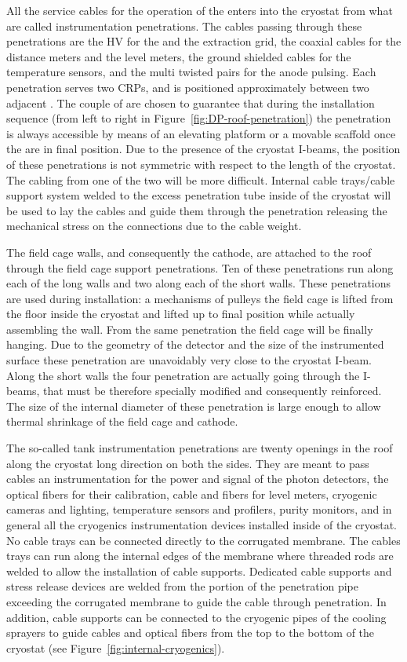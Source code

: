 All the service cables for the operation of the  enters into the cryostat from what are called  instrumentation penetrations.
The cables passing through these penetrations are the HV for the  and the extraction grid, the coaxial cables for the distance meters and the level meters, the ground shielded cables for the temperature sensors, and the multi twisted pairs for the anode pulsing.
Each penetration serves two CRPs, and is positioned approximately between two adjacent .
The couple of  are chosen to guarantee that during the installation sequence (from left to right in Figure~\ref{fig:DP-roof-penetration}) the penetration is always accessible by means of an elevating platform or a movable scaffold once the  are in final position.
Due to the presence of the cryostat I-beams, the position of these penetrations is not symmetric with respect to the length of the cryostat.
The cabling from one of the two  will be more difficult.
Internal cable trays/cable support system welded to the excess penetration tube inside of the cryostat will be used to lay the cables and guide them through the penetration releasing the mechanical stress on the connections due to the cable weight.

The field cage walls, and consequently the cathode, are attached to the roof through the field cage support penetrations.
Ten of these penetrations run along each of the long walls and two along each of the short walls.
These penetrations are used during installation: a mechanisms of pulleys the field cage is lifted from the floor inside the cryostat and lifted up to final position while actually assembling the wall.
From the same penetration the field cage will be finally hanging.
Due to the geometry of the detector and the size of the instrumented surface these penetration are unavoidably very close to the cryostat I-beam.
Along the short walls the four penetration are actually going through the I-beams, that must be therefore specially modified and consequently reinforced.
The size of the internal diameter of these penetration is large enough to allow thermal shrinkage of the field cage and cathode.

The so-called tank instrumentation penetrations are twenty openings in the roof along the cryostat long direction on both the sides.
They are meant to pass cables an instrumentation for the power and signal of the photon detectors, the optical fibers for their calibration, cable and fibers for level meters, cryogenic cameras and lighting, temperature sensors and profilers, purity monitors, and in general all the cryogenics instrumentation devices installed inside of the cryostat.
No cable trays can be connected directly to the corrugated membrane.
The cables trays can run along the internal edges of the membrane where threaded rods are welded to allow the installation of cable supports.
Dedicated cable supports and stress release devices are welded from the portion of the penetration pipe exceeding the corrugated membrane to guide the cable through penetration.
In addition, cable supports can be connected to the cryogenic pipes of the cooling sprayers to guide cables and optical fibers from the top to the bottom of the cryostat (see Figure~\ref{fig:internal-cryogenics}).

